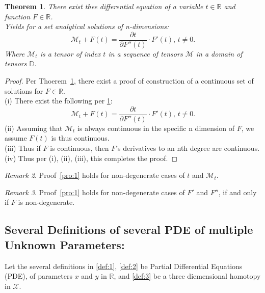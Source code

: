 \documentclass[10pt]{article}
\theoremstyle{plain}
\newtheorem{theorem}{Theorem}[section]
\theoremstyle{definition}
\theoremstyle{remark}
\newtheorem{remark}[theorem]{Remark}
\begin{document}
\begin{theorem}
\label{theo:1}
There exist thee differential equation of a variable $t \in \mathbb{R}$ and function $F \in \mathbb{R}$.\\
Yields for a set analytical solutions of n-dimensions:
\begin{equation}
	\mathcal{M}_{t} + F(t) = \frac{\partial t}{\partial F''(t)} \cdot F'(t), \, t \neq 0.
\end{equation}
Where $\mathcal{M}_{t}$ is a tensor of index $t$ in a sequence of tensors $\mathcal{M}$ in a domain of tensors $\mathbb{D}$.
\end{theorem}
\begin{proof}
\label{pro:1}
Per Thoerem~\ref{theo:1}, there exist a proof of construction of a continuous set of solutions for $F \in \mathbb{R}$.\\
(i) There exist the following per \ref{theo:1}:
\begin{equation}
	\mathcal{M}_{t} + F(t) = \frac{\partial t}{\partial F''(t)} \cdot F'(t), \, t \neq 0.
\end{equation}
(ii) Assuming that $\mathcal{M}_t$ is always continuous in the specific n dimension of $F$, we assume $F(t)$ is thus continuous.\\
(iii) Thus if $F$ is continuous, then $F$'s derivatives to an nth degree are continuous.\\
(iv) Thus per (i), (ii), (iii), this completes the proof.
\end{proof}
\begin{remark}
Proof~\ref{pro:1} holds for non-degenerate cases of $t$ and $\mathcal{M}_{t}$.
\end{remark}
\begin{remark}
Proof~\ref{pro:1} holds for non-degenerate cases of $F'$ and $F''$, if and only if $F$ is non-degenerate.
\end{remark}

\subsection{Several Definitions of several PDE of multiple Unknown Parameters:}

Let the several definitions in \ref{def:1}, \ref{def:2} be Partial Differential Equations (PDE), of parameters $x$ and $y$ in $\mathbb{R}$, and \ref{def:3} be a three diemensional homotopy in $\mathcal{X}$.
\end{document}
